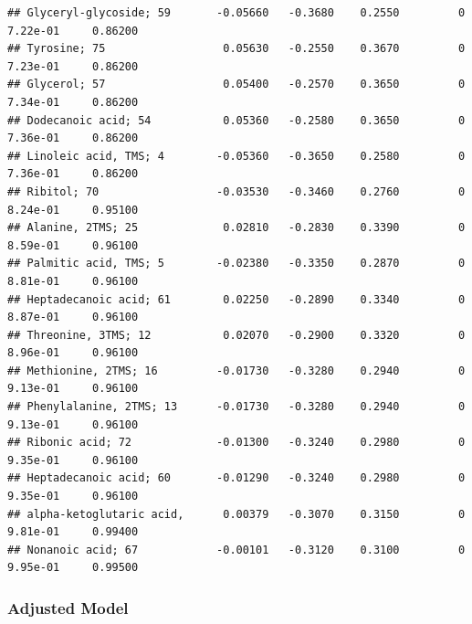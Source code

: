 \documentclass[]{article}
\begin{document}
\begin{verbatim}
## Glyceryl-glycoside; 59       -0.05660   -0.3680    0.2550         0   7.22e-01     0.86200
## Tyrosine; 75                  0.05630   -0.2550    0.3670         0   7.23e-01     0.86200
## Glycerol; 57                  0.05400   -0.2570    0.3650         0   7.34e-01     0.86200
## Dodecanoic acid; 54           0.05360   -0.2580    0.3650         0   7.36e-01     0.86200
## Linoleic acid, TMS; 4        -0.05360   -0.3650    0.2580         0   7.36e-01     0.86200
## Ribitol; 70                  -0.03530   -0.3460    0.2760         0   8.24e-01     0.95100
## Alanine, 2TMS; 25             0.02810   -0.2830    0.3390         0   8.59e-01     0.96100
## Palmitic acid, TMS; 5        -0.02380   -0.3350    0.2870         0   8.81e-01     0.96100
## Heptadecanoic acid; 61        0.02250   -0.2890    0.3340         0   8.87e-01     0.96100
## Threonine, 3TMS; 12           0.02070   -0.2900    0.3320         0   8.96e-01     0.96100
## Methionine, 2TMS; 16         -0.01730   -0.3280    0.2940         0   9.13e-01     0.96100
## Phenylalanine, 2TMS; 13      -0.01730   -0.3280    0.2940         0   9.13e-01     0.96100
## Ribonic acid; 72             -0.01300   -0.3240    0.2980         0   9.35e-01     0.96100
## Heptadecanoic acid; 60       -0.01290   -0.3240    0.2980         0   9.35e-01     0.96100
## alpha-ketoglutaric acid,      0.00379   -0.3070    0.3150         0   9.81e-01     0.99400
## Nonanoic acid; 67            -0.00101   -0.3120    0.3100         0   9.95e-01     0.99500
\end{verbatim}

\newpage

\hypertarget{adjusted-model}{%
\subsubsection{Adjusted Model}\label{adjusted-model}}
\end{document}

